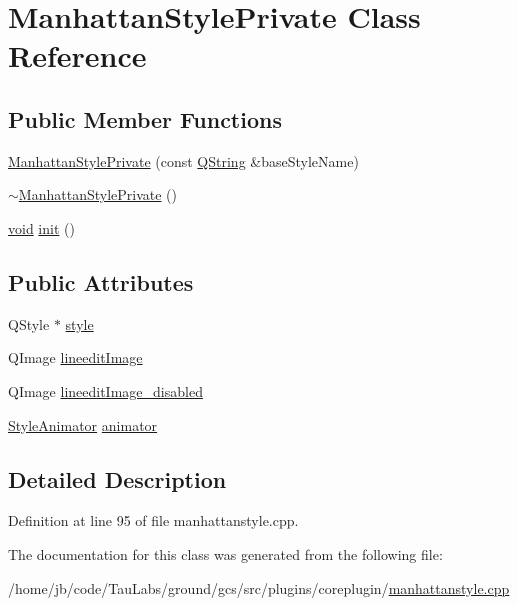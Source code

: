 \hypertarget{class_manhattan_style_private}{\section{\-Manhattan\-Style\-Private \-Class \-Reference}
\label{class_manhattan_style_private}
}
\subsection*{\-Public \-Member \-Functions}
\begin{DoxyCompactItemize}
\item 
\hyperlink{group___core_plugin_gaa6c99cfeba9a6ca806dd80e4930ef4b2}{\-Manhattan\-Style\-Private} (const \hyperlink{group___u_a_v_objects_plugin_gab9d252f49c333c94a72f97ce3105a32d}{\-Q\-String} \&base\-Style\-Name)
\item 
\hyperlink{group___core_plugin_gafa95005067f1109eeb85e1932a592104}{$\sim$\-Manhattan\-Style\-Private} ()
\item 
\hyperlink{group___u_a_v_objects_plugin_ga444cf2ff3f0ecbe028adce838d373f5c}{void} \hyperlink{group___core_plugin_ga33bd5752098c4000975e3d2ec2b1714d}{init} ()
\end{DoxyCompactItemize}
\subsection*{\-Public \-Attributes}
\begin{DoxyCompactItemize}
\item 
\-Q\-Style $\ast$ \hyperlink{group___core_plugin_ga592a11bdeaf57b9f1254f83e895c2c4a}{style}
\item 
\-Q\-Image \hyperlink{group___core_plugin_ga3afdf7e9c4d6004b467dee3f941439ed}{lineedit\-Image}
\item 
\-Q\-Image \hyperlink{group___core_plugin_ga3fd36c3c8443ddd74203de9f20e0e404}{lineedit\-Image\-\_\-disabled}
\item 
\hyperlink{class_style_animator}{\-Style\-Animator} \hyperlink{group___core_plugin_gaeb6b3907adb0abaf3c983940d0fb6fea}{animator}
\end{DoxyCompactItemize}


\subsection{\-Detailed \-Description}


\-Definition at line 95 of file manhattanstyle.\-cpp.



\-The documentation for this class was generated from the following file\-:\begin{DoxyCompactItemize}
\item 
/home/jb/code/\-Tau\-Labs/ground/gcs/src/plugins/coreplugin/\hyperlink{manhattanstyle_8cpp}{manhattanstyle.\-cpp}\end{DoxyCompactItemize}
